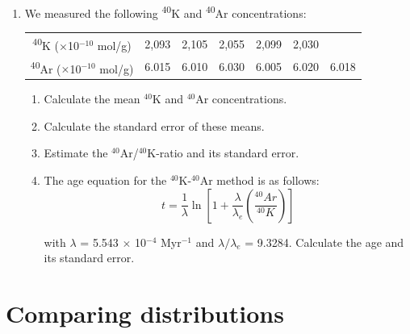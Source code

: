 \begin{enumerate}
\item We measured the following \textsuperscript{40}K and
  \textsuperscript{40}Ar concentrations:
  \begin{center}
    \begin{tabular}{c|cccccc}
      \textsuperscript{40}K ($\times$10$^{-10}$ mol/g) & 2,093 & 2,105 & 2,055 & 2,099 & 2,030 & ~ \\
      \textsuperscript{40}Ar ($\times$10$^{-10}$ mol/g) & 6.015 & 6.010 & 6.030 & 6.005 & 6.020 & 6.018 
    \end{tabular}
  \end{center}
\begin{enumerate}
\item Calculate the mean $^{40}$K and $^{40}$Ar concentrations.
\item Calculate the standard error of these means.
\item Estimate the $^{40}$Ar/$^{40}$K-ratio and its standard error.
\item The age equation for the $^{40}$K-$^{40}$Ar method is as follows:
\[
t = \frac{1}{\lambda} \ln\left[ 1 + \frac{\lambda}{\lambda_e}
  \left(\frac{^{40}Ar }{^{40}K}\right) \right]
\]

with $\lambda$ = 5.543 $\times$ 10$^{-4}$ Myr$^{-1}$ and
$\lambda/\lambda_e$ = 9.3284.  Calculate the age and its standard error.
\end{enumerate}

\end{enumerate}

\section{Comparing distributions}
\label{sec:ex-comparingdistributions}

